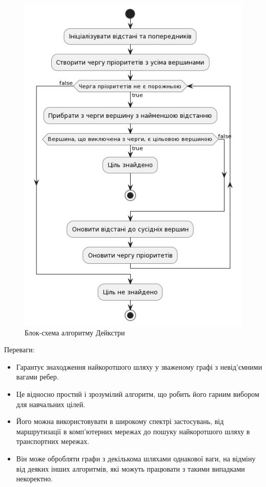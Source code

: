 \begin{figure}[!htp]
    \centering
    \includegraphics[scale=0.7]{content/chapters/2-implementation-methods/assets/img/dijkstras_algorithm.png}
    \caption{Блок-схема алгоритму Дейкстри}
    \label{fig:dijkstras}
\end{figure}

Переваги:
\begin{itemize}
    \item Гарантує знаходження найкоротшого шляху у зваженому графі з невід'ємними вагами ребер.
    \item Це відносно простий і зрозумілий алгоритм, що робить його гарним вибором для навчальних цілей.
    \item Його можна використовувати в широкому спектрі застосувань, від маршрутизації в комп'ютерних мережах до пошуку найкоротшого шляху в транспортних мережах.
    \item Він може обробляти графи з декількома шляхами однакової ваги, на відміну від деяких інших алгоритмів, які можуть працювати з такими випадками некоректно.
\end{itemize}

